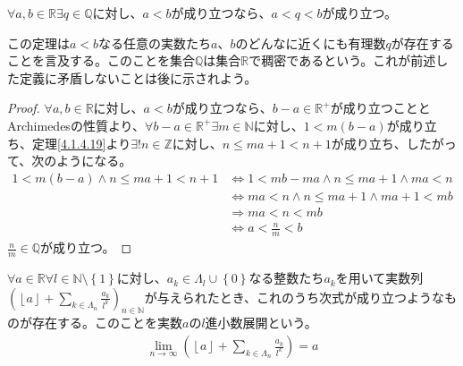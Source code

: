 \documentclass[dvipdfmx]{jsarticle}
\begin{document}
\begin{thm}\label{4.1.4.20}
$\forall a,b \in \mathbb{R}\exists q \in \mathbb{Q}$に対し、$a < b$が成り立つなら、$a < q < b$が成り立つ。
\end{thm}\par
この定理は$a < b$なる任意の実数たち$a$、$b$のどんなに近くにも有理数$q$が存在することを言及する。このことを集合$\mathbb{Q}$は集合$\mathbb{R}$で稠密であるという。これが前述した定義に矛盾しないことは後に示されよう。
\begin{proof}
$\forall a,b \in \mathbb{R}$に対し、$a < b$が成り立つなら、$b - a \in \mathbb{R}^{+}$が成り立つこととArchimedesの性質より、$\forall b - a \in \mathbb{R}^{+}\exists m \in \mathbb{N}$に対し、$1 < m(b - a)$が成り立ち、定理\ref{4.1.4.19}より$\exists!n \in \mathbb{Z}$に対し、$n \leq ma + 1 < n + 1$が成り立ち、したがって、次のようになる。
\begin{align*}
1 < m(b - a) \land n \leq ma + 1 < n + 1 &\Leftrightarrow 1 < mb - ma \land n \leq ma + 1 \land ma < n\\
&\Leftrightarrow ma < n \land n \leq ma + 1 \land ma + 1 < mb\\
&\Rightarrow ma < n < mb\\
&\Leftrightarrow a < \frac{n}{m} < b
\end{align*}
$\frac{n}{m} \in \mathbb{Q}$が成り立つ。
\end{proof}
\begin{thm}[$l$進小数展開]\label{4.1.4.21}
$\forall a \in \mathbb{R}\forall l \in \mathbb{N} \setminus \left\{ 1 \right\}$に対し、$a_{k} \in \varLambda_{l} \cup \left\{ 0 \right\}$なる整数たち$a_{k}$を用いて実数列$\left( \left\lfloor a \right\rfloor + \sum_{k \in \varLambda_{n}} \frac{a_{k}}{l^{k}} \right)_{n \in \mathbb{N}}$が与えられたとき、これのうち次式が成り立つようなものが存在する。このことを実数$a$の$l$進小数展開という。
\begin{align*}
\lim_{n \rightarrow \infty}\left( \left\lfloor a \right\rfloor + \sum_{k \in \varLambda_{n}} \frac{a_{k}}{l^{k}} \right) = a
\end{align*}
\end{thm}
\end{document}
